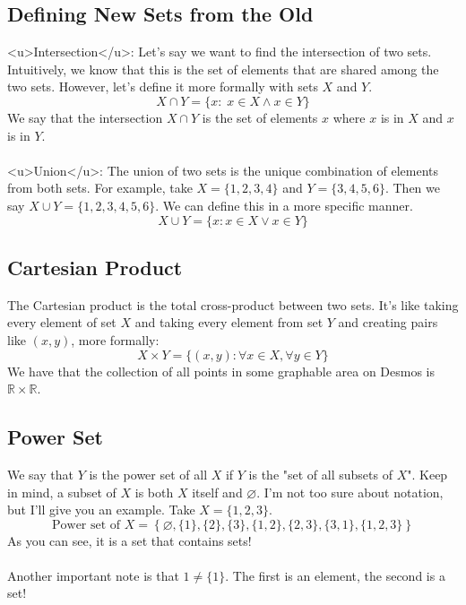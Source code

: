 \subsection{Defining New Sets from the Old}
<u>Intersection</u>: Let's say we want to find the intersection of two sets. Intuitively, we know that this is the set of elements that are shared among the two sets. However, let's define it more formally with sets $X$ and $Y$. 
$$
X \cap Y = \{x :\; x \in X \wedge x \in Y\}
$$
We say that the intersection $X \cap Y$ is the set of elements $x$ where $x$ is in $X$ and $x$ is in $Y$. \\
\\
<u>Union</u>: The union of two sets is the unique combination of elements from both sets. For example, take $X = \{1,2,3,4\}$ and $Y = \{3,4,5,6\}$. Then we say $X \cup Y = \{1,2,3,4,5,6\}$. We can define this in a more specific manner.
$$
X \cup Y = \{x : x \in X \vee x \in Y \}
$$

\subsection{Cartesian Product}

The Cartesian product is the total cross-product between two sets. It's like taking every element of set $X$ and taking every element from set $Y$ and creating pairs like $(x,y)$, more formally:
$$
X \times Y = \{(x,y) : \forall x \in X, \forall y \in Y\}
$$
We have that the collection of all points in some graphable area on Desmos is $\mathbb{R} \times \mathbb{R}$. 
\subsection{Power Set}
We say that $Y$ is the power set of all $X$ if $Y$ is the "set of all subsets of $X$". Keep in mind, a subset of $X$ is both $X$ itself and $\varnothing$. I'm not too sure about notation, but I'll give you an example. Take $X = \{1,2,3\}$. 
$$
\text{Power set of }X = \left\{\varnothing, \{1\}, \{2\}, \{3\}, \{1,2\}, \{2,3\}, \{3,1\}, \{1,2,3\}\right\}
$$
As you can see, it is a set that contains sets!\\
\\
Another important note is that $1 \neq \{1\}$. The first is an element, the second is a set! 

